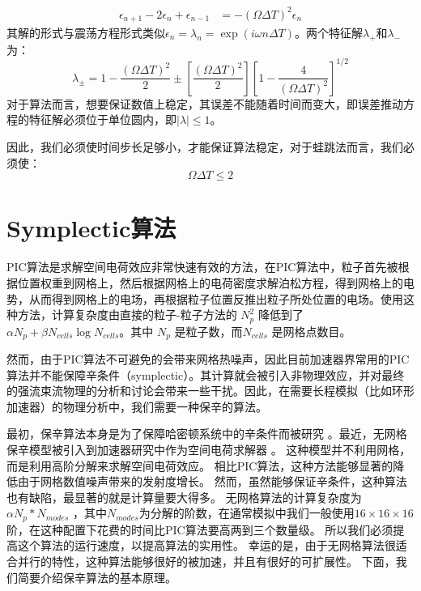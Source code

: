 {\begin{align}
         {\epsilon}_{n+1}-2{\epsilon}_n+{\epsilon}_{n-1} &= -(\Omega \Delta T)^2 {\epsilon}_n
         \label{eq:leapfrog_stabilit12}
      \end{align}
其解的形式与震荡方程形式类似${\epsilon}_n = {\lambda}_n = \exp(i\omega n \Delta T)$。两个特征解${\lambda}_+$和${\lambda}_-$为：
      \begin{equation}
         \label{eq:leapfrog_stabilit13}
         {\lambda}_\pm = 1- \frac{(\Omega \Delta T)^2}{2}\pm \left[\frac{(\Omega \Delta T)^2}{2}\right]\left[1-\frac{4}{(\Omega \Delta T)^2}\right]^{1/2}
      \end{equation}
对于算法而言，想要保证数值上稳定，其误差不能随着时间而变大，即误差推动方程的特征解必须位于单位圆内，即$|\lambda|\leq1$。

因此，我们必须使时间步长足够小，才能保证算法稳定，对于蛙跳法而言，我们必须使：
      \begin{equation}
          \Omega \Delta T \leq 2
      \end{equation}


\section{Symplectic算法}
\label{section:symplectic_theory}

PIC算法是求解空间电荷效应非常快速有效的方法，在PIC算法中，粒子首先被根据位置权重到网格上，然后根据网格上的电荷密度求解泊松方程，得到网格上的电势，从而得到网格上的电场，再根据粒子位置反推出粒子所处位置的电场。使用这种方法，计算复杂度由直接的粒子-粒子方法的 $N_p^2$ 降低到了$\alpha N_p + \beta N_{cells}\log{N_{cells}}$。其中 $N_p$ 是粒子数，而$N_{cells}$ 是网格点数目。

然而，由于PIC算法不可避免的会带来网格热噪声，因此目前加速器界常用的PIC算法并不能保障辛条件（symplectic）。其计算就会被引入非物理效应，并对最终的强流束流物理的分析和讨论会带来一些干扰。因此，在需要长程模拟（比如环形加速器）的物理分析中，我们需要一种保辛的算法。

最初，保辛算法本身是为了保障哈密顿系统中的辛条件而被研究 \cite{symplectic_channel1990, symplectic_yoshida1990}。最近，无网格保辛模型被引入到加速器研究中作为空间电荷求解器 \cite{symplectic_ji2017}。
这种模型并不利用网格，而是利用高阶分解来求解空间电荷效应。
相比PIC算法，这种方法能够显著的降低由于网格数值噪声带来的发射度增长。
然而，虽然能够保证辛条件，这种算法也有缺陷，最显著的就是计算量要大得多。
无网格算法的计算复杂度为 $\alpha N_p * N_{modes}$ ，其中$N_{modes}$为分解的阶数，在通常模拟中我们一般使用$16 \times 16 \times 16$ 阶，在这种配置下花费的时间比PIC算法要高两到三个数量级。
所以我们必须提高这个算法的运行速度，以提高算法的实用性。
幸运的是，由于无网格算法很适合并行的特性，这种算法能够很好的被加速，并且有很好的可扩展性。
下面，我们简要介绍保辛算法的基本原理。

}
